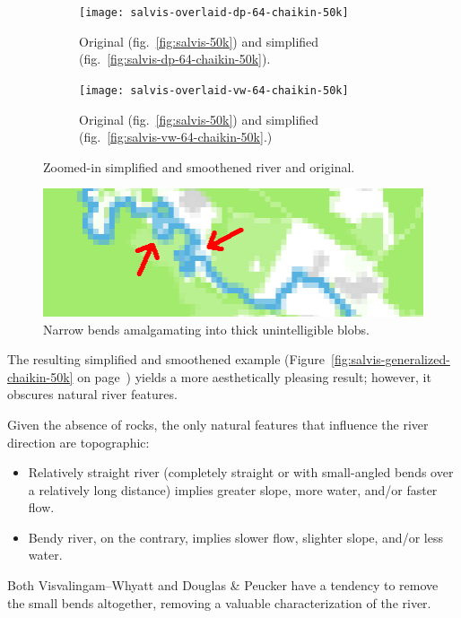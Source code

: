 \documentclass[a4paper]{article}
\newcommand{\onpage}[1]{\ref{#1} on page~\pageref{#1}}
\newcommand{\DP}{Douglas \& Peucker}
\newcommand{\VW}{Visvalingam--Whyatt}
\begin{document}
\begin{figure}[ht!]
    \centering
    \begin{subfigure}[b]{.49\textwidth}
        \texttt{[image: salvis-overlaid-dp-64-chaikin-50k]}

        \caption{Original (fig.~\ref{fig:salvis-50k}) and simplified
        (fig.~\ref{fig:salvis-dp-64-chaikin-50k}).}

    \end{subfigure}
    \hfill
    \begin{subfigure}[b]{.49\textwidth}
        \texttt{[image: salvis-overlaid-vw-64-chaikin-50k]}

        \caption{Original (fig.~\ref{fig:salvis-50k}) and simplified
            (fig.~\ref{fig:salvis-vw-64-chaikin-50k}.)}

    \end{subfigure}
    \caption{Zoomed-in simplified and smoothened river and original.}
    \label{fig:salvis-overlaid-generalized-chaikin-50k}
\end{figure}

\begin{figure}[b!]
    \centering
    \includegraphics[width=.9\textwidth]{amalgamate1}
    \caption{Narrow bends amalgamating into thick unintelligible blobs.}
    \label{fig:pixel-amalgamation}
\end{figure}

The resulting simplified and smoothened example
(Figure~\onpage{fig:salvis-generalized-chaikin-50k}) yields a more
aesthetically pleasing result; however, it obscures natural river features.

Given the absence of rocks, the only natural features that influence the river
direction are topographic:

\begin{itemize}
    \item Relatively straight river (completely straight or with small-angled
        bends over a relatively long distance) implies greater slope, more
        water, and/or faster flow.

    \item Bendy river, on the contrary, implies slower flow, slighter slope,
        and/or less water.

\end{itemize}
Both {\VW} and {\DP} have a tendency to remove the small bends altogether,
removing a valuable characterization of the river.
\end{document}
